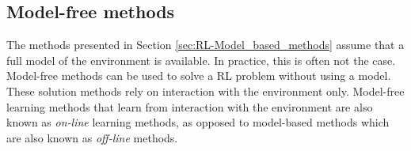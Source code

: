 %			





\subsection{Model-free methods}\label{sec:RL-Model_free_methods}
The methods presented in Section \ref{sec:RL-Model_based_methods} assume that a full model of the environment is available. In practice, this is often not the case. Model-free methods can be used to solve a \ac{RL} problem without using a model. These solution methods rely on interaction with the environment only. Model-free learning methods that learn from interaction with the environment are also known as \emph{on-line} learning methods, as opposed to model-based methods which are also known as \emph{off-line} methods.
		
		
